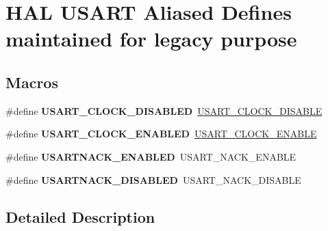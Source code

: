 \hypertarget{group___h_a_l___u_s_a_r_t___aliased___defines}{}\section{H\+AL U\+S\+A\+RT Aliased Defines maintained for legacy purpose}
\label{group___h_a_l___u_s_a_r_t___aliased___defines}
\subsection*{Macros}
\begin{DoxyCompactItemize}
\item 
\mbox{\label{group___h_a_l___u_s_a_r_t___aliased___defines_ga45c49fb3e5ff70db2dea36e909ffa07a}} 
\#define {\bfseries U\+S\+A\+R\+T\+\_\+\+C\+L\+O\+C\+K\+\_\+\+D\+I\+S\+A\+B\+L\+ED}~\hyperlink{group___u_s_a_r_t___clock_ga7c889a9b9716214fc680eb75ca18c009}{U\+S\+A\+R\+T\+\_\+\+C\+L\+O\+C\+K\+\_\+\+D\+I\+S\+A\+B\+LE}
\item 
\mbox{\label{group___h_a_l___u_s_a_r_t___aliased___defines_ga259282d33c89b8a3ce2db2192124ce61}} 
\#define {\bfseries U\+S\+A\+R\+T\+\_\+\+C\+L\+O\+C\+K\+\_\+\+E\+N\+A\+B\+L\+ED}~\hyperlink{group___u_s_a_r_t___clock_gac055ca6ca9647277e3f89a5df9529730}{U\+S\+A\+R\+T\+\_\+\+C\+L\+O\+C\+K\+\_\+\+E\+N\+A\+B\+LE}
\item 
\mbox{\label{group___h_a_l___u_s_a_r_t___aliased___defines_ga5e2a0ab7e7ccbdc9832d363b95389f7f}} 
\#define {\bfseries U\+S\+A\+R\+T\+N\+A\+C\+K\+\_\+\+E\+N\+A\+B\+L\+ED}~U\+S\+A\+R\+T\+\_\+\+N\+A\+C\+K\+\_\+\+E\+N\+A\+B\+LE
\item 
\mbox{\label{group___h_a_l___u_s_a_r_t___aliased___defines_ga44c940c85051784c23cb5fdef98fe5e3}} 
\#define {\bfseries U\+S\+A\+R\+T\+N\+A\+C\+K\+\_\+\+D\+I\+S\+A\+B\+L\+ED}~U\+S\+A\+R\+T\+\_\+\+N\+A\+C\+K\+\_\+\+D\+I\+S\+A\+B\+LE
\end{DoxyCompactItemize}


\subsection{Detailed Description}
